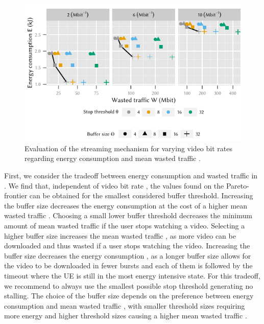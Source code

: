 \begin{figure}
  \centering
  \includegraphics{application/lte_video/trade_offs/figures/energy2lostData}
  \caption{Evaluation of the streaming mechanism for varying video bit rates \bitrate regarding energy consumption \energyconsumption and mean wasted traffic \meanwastedtraffic.}
  \label{fig:application:lte_video:numerical_evaluation:trade_offs:energy2lostData}
\end{figure}

First, we consider the tradeoff between energy consumption \energyconsumption and wasted traffic in .
We find that, independent of video bit rate \bitrate, the values found on the Pareto-frontier can be obtained for the smallest considered buffer threshold.
Increasing the buffer size decreases the energy consumption \energyconsumption at the cost of a higher mean wasted traffic \meanwastedtraffic.
Choosing a small lower buffer threshold \bufferlower decreases the minimum amount of mean wasted traffic \meanwastedtraffic if the user stops watching a video.
Selecting a higher buffer size \buffersize  increases the mean wasted traffic \meanwastedtraffic, as more video can be downloaded and thus wasted if a user stops watching the video.
Increasing the buffer size \buffersize decreases the energy consumption \energyconsumption, as a longer buffer size allows for the video to be downloaded in fewer bursts and each of them is followed by the \tidle timeout where the \gls{UE} is still in the most energy intensive \rrcconnected state.
For this tradeoff, we recommend to always use the smallest possible stop threshold generating no stalling.
The choice of the buffer size depends on the preference between energy consumption \energyconsumption and mean wasted traffic \meanwastedtraffic, with smaller threshold sizes requiring more energy and higher threshold sizes causing a higher mean wasted traffic \meanwastedtraffic.

